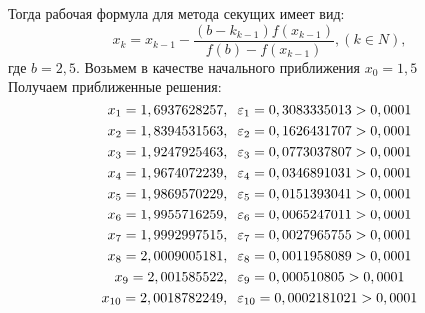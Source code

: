 \documentclass[12pt]{article}
\begin{document}
\begin{enumerate}[label=\textbf{\arabic*})]
	Тогда рабочая формула для метода секущих имеет вид:
\begin{equation*}
	x_k = x_{k-1} - \dfrac{(b-k_{k-1})f(x_{k-1})}{f(b)-f(x_{k-1})}, (k \in N),
\end{equation*}
где $b = 2,5$. Возьмем в качестве начального приближения $x_0 = 1,5$ \\
Получаем приближенные решения:
\begin{equation*}
	x_1 = 1,6937628257, \hspace{0.2cm}
	\varepsilon_1 = 0,3083335013 > 0,0001
\end{equation*}
\begin{equation*}
	x_2 = 1,8394531563, \hspace{0.2cm}
	\varepsilon_2 = 0,1626431707 > 0,0001
\end{equation*}
\begin{equation*}
	x_3 = 1,9247925463, \hspace{0.2cm}
	\varepsilon_3 = 0,0773037807 > 0,0001
\end{equation*}
\begin{equation*}
	x_4 = 1,9674072239, \hspace{0.2cm}
	\varepsilon_4 = 0,0346891031 > 0,0001
\end{equation*}
\begin{equation*}
	x_5 = 1,9869570229, \hspace{0.2cm}
	\varepsilon_5 = 0,0151393041 > 0,0001
\end{equation*}
\begin{equation*}
	x_6 = 1,9955716259, \hspace{0.2cm}
	\varepsilon_6 = 0,0065247011 > 0,0001
\end{equation*}
\begin{equation*}
	x_7 = 1,9992997515, \hspace{0.2cm}
	\varepsilon_7 = 0,0027965755 > 0,0001
\end{equation*}
\begin{equation*}
	x_8 = 2,0009005181, \hspace{0.2cm}
	\varepsilon_8 = 0,0011958089 > 0,0001
\end{equation*}
\begin{equation*}
	x_9 = 2,001585522, \hspace{0.2cm}
	\varepsilon_9 = 0,000510805 > 0,0001
\end{equation*}
\begin{equation*}
	x_{10} = 2,0018782249, \hspace{0.2cm}
	\varepsilon_{10} = 0,0002181021 > 0,0001

\end{equation*}
\end{enumerate}
\end{document}
